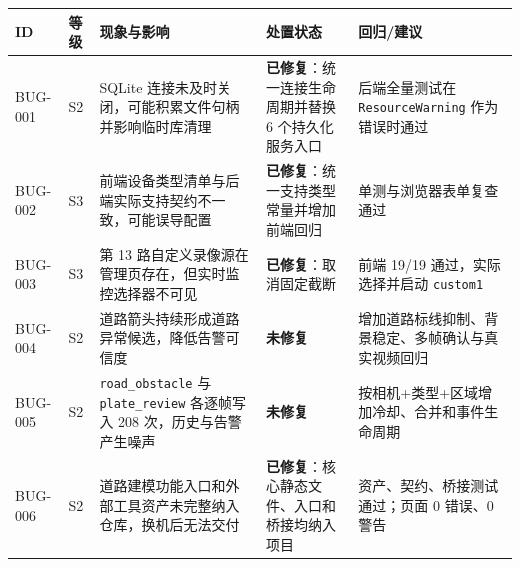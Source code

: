 \begin{longtable}[]{@{}
  >{\raggedright\arraybackslash}p{}
  >{\raggedright\arraybackslash}p{}
  >{\raggedright\arraybackslash}p{}
  >{\raggedright\arraybackslash}p{}
  >{\raggedright\arraybackslash}p{}@{}}
\toprule\noalign{}
\begin{minipage}[b]{\linewidth}\raggedright
ID
\end{minipage} & \begin{minipage}[b]{\linewidth}\raggedright
等级
\end{minipage} & \begin{minipage}[b]{\linewidth}\raggedright
现象与影响
\end{minipage} & \begin{minipage}[b]{\linewidth}\raggedright
处置状态
\end{minipage} & \begin{minipage}[b]{\linewidth}\raggedright
回归/建议
\end{minipage} \\
\midrule\noalign{}
\endhead
\bottomrule\noalign{}
\endlastfoot
BUG-001 & S2 & SQLite 连接未及时关闭，可能积累文件句柄并影响临时库清理 & \textbf{已修复}：统一连接生命周期并替换 6 个持久化服务入口 & 后端全量测试在 \texttt{Resource\allowbreak{}Warning} 作为错误时通过 \\
BUG-002 & S3 & 前端设备类型清单与后端实际支持契约不一致，可能误导配置 & \textbf{已修复}：统一支持类型常量并增加前端回归 & 单测与浏览器表单复查通过 \\
BUG-003 & S3 & 第 13 路自定义录像源在管理页存在，但实时监控选择器不可见 & \textbf{已修复}：取消固定截断 & 前端 19/19 通过，实际选择并启动 \texttt{custom1} \\
BUG-004 & S2 & 道路箭头持续形成道路异常候选，降低告警可信度 & \textbf{未修复} & 增加道路标线抑制、背景稳定、多帧确认与真实视频回归 \\
BUG-005 & S2 & \texttt{road\_\allowbreak{}obstacle} 与 \texttt{plate\_\allowbreak{}review} 各逐帧写入 208 次，历史与告警产生噪声 & \textbf{未修复} & 按相机+类型+区域增加冷却、合并和事件生命周期 \\
BUG-006 & S2 & 道路建模功能入口和外部工具资产未完整纳入仓库，换机后无法交付 & \textbf{已修复}：核心静态文件、入口和桥接均纳入项目 & 资产、契约、桥接测试通过；页面 0 错误、0 警告 \\
\end{longtable}

